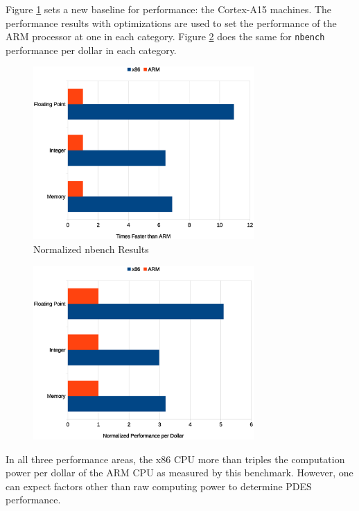 \documentclass[11pt]{book}
\begin{document}
Figure \ref{nbench-performance} sets a new baseline for performance: the Cortex-A15
machines.  The performance results with optimizations are used to set the performance of
the ARM processor at one in each category.  Figure \ref{nbench-cost} does the same for
\verb;nbench; performance per dollar in each category.

\begin{figure}
\centering
\includegraphics[width=0.75\textwidth]{nbench_performance}
\caption{Normalized nbench Results}
\label{nbench-performance}
\end{figure}


\begin{figure}
\centering
\includegraphics[width=0.75\textwidth]{nbench_cost}
\label{nbench-cost}
\end{figure}

In all three performance areas, the x86 CPU more than triples the computation power per
dollar of the ARM CPU as measured by this benchmark.  However, one can expect factors
other than raw computing power to determine PDES performance.
\end{document}
